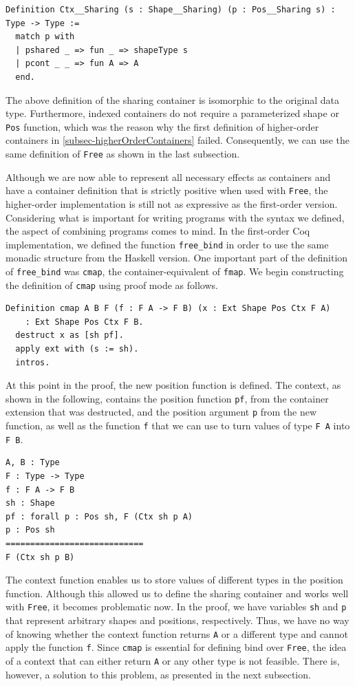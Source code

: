 \documentclass[a4paper, 11pt, fleqn, twoside]{scrreprt}
\newcommand{\cinl}[1]{\texttt{#1}}
\begin{document}
\begin{verbatim}
Definition Ctx__Sharing (s : Shape__Sharing) (p : Pos__Sharing s) : Type -> Type :=
  match p with
  | pshared _ => fun _ => shapeType s
  | pcont _ _ => fun A => A
  end.
\end{verbatim}

The above definition of the sharing container is isomorphic to the original data type.
Furthermore, indexed containers do not require a parameterized shape or \cinl{Pos} function, which was the reason why the first definition of higher-order containers in \autoref{subsec-higherOrderContainers} failed.
Consequently, we can use the same definition of \cinl{Free} as shown in the last subsection.

Although we are now able to represent all necessary effects as containers and have a container definition that is strictly positive when used with \cinl{Free}, the higher-order implementation is still not as expressive as the first-order version.
Considering what is important for writing programs with the syntax we defined, the aspect of combining programs comes to mind.
In the first-order Coq implementation, we defined the function \cinl{free_bind} in order to use the same monadic structure from the Haskell version.
One important part of the definition of \cinl{free_bind} was \cinl{cmap}, the container-equivalent of \cinl{fmap}.
We begin constructing the definition of \cinl{cmap} using proof mode as follows.

\begin{verbatim}
Definition cmap A B F (f : F A -> F B) (x : Ext Shape Pos Ctx F A) 
    : Ext Shape Pos Ctx F B.
  destruct x as [sh pf].
  apply ext with (s := sh).
  intros.
\end{verbatim}

At this point in the proof, the new position function is defined.
The context, as shown in the following, contains the position function \cinl{pf}, from the container extension that was destructed, and the position argument \cinl{p} from the new function, as well as the function \cinl{f} that we can use to turn values of type \cinl{F A} into \cinl{F B}.

\begin{verbatim}
A, B : Type
F : Type -> Type
f : F A -> F B
sh : Shape
pf : forall p : Pos sh, F (Ctx sh p A)
p : Pos sh
============================
F (Ctx sh p B)
\end{verbatim}

The context function enables us to store values of different types in the position function.
Although this allowed us to define the sharing container and works well with \cinl{Free}, it becomes problematic now.
In the proof, we have variables \cinl{sh} and \cinl{p} that represent arbitrary shapes and positions, respectively.
Thus, we have no way of knowing whether the context function returns \cinl{A} or a different type and cannot apply the function \cinl{f}.
Since \cinl{cmap} is essential for defining bind over \cinl{Free}, the idea of a context that can either return \cinl{A} or any other type is not feasible.
There is, however, a solution to this problem, as presented in the next subsection.
\end{document}
